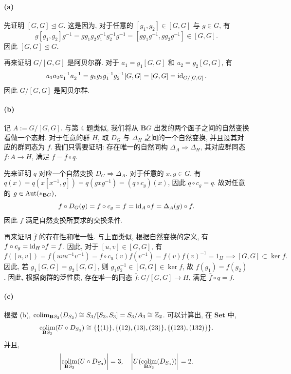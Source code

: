\documentclass{article}
\begin{document}
\begin{solution}
	\paragraph{(a)} 先证明 $[G,G] \unlhd G$. 这是因为, 对于任意的 $[g_1, g_2] \in [G, G]$ 与 $g \in G$, 有
	\[ g[g_1, g_2]g^{-1} = gg_1g_2g_1^{-1}g_2^{-1}g^{-1} = [gg_1g^{-1}, gg_2g^{-1}] \in [G, G]. \]
	因此 $[G, G] \unlhd G$. 

	再来证明 $G/[G, G]$ 是阿贝尔群. 对于 $a_1 = g_1[G, G]$ 和 $a_2 = g_2[G, G]$, 有
	\[ a_1a_2a_1^{-1}a_2^{-1} = g_1g_2g_1^{-1}g_2^{-1}[G, G] = [G, G] = \operatorname{id}_{G/[G, G]}. \]
	因此 $G/[G, G]$ 是阿贝尔群.

	\paragraph{(b)} 记 $A := G/[G, G]$. 与第 4 题类似, 我们将从 $\mathbf{B}G$ 出发的两个函子之间的自然变换看做一个态射. 对于任意的群 $H$, 取 $D_G$ 与 $\Delta_H$ 之间的一个自然变换, 并且设其对应的群同态为 $f$. 我们只需要证明: 存在唯一的自然同构 $\Delta_A \Rightarrow \Delta_H$, 其对应群同态 $\bar{f}: A \to H$, 满足 $f = \bar{f} \circ q$. 

	先来证明 $q$ 对应一个自然变换 $D_G \Rightarrow \Delta_A$. 对于任意的 $x, g \in G$, 有 $q(x) = q(x[x^{-1}, g]) = q(gxg^{-1}) = (q \circ c_g)(x)$, 因此 $q \circ c_g = q$. 故对任意的 $g \in \operatorname{Aut}(*_{\mathbf{B}G})$, 
	\[ f \circ D_G(g) = f \circ c_g = f = \operatorname{id}_A \circ f = \Delta_A(g) \circ f. \]
	因此 $f$ 满足自然变换所要求的交换条件. 

	再来证明 $\bar{f}$ 的存在性和唯一性. 与上面类似, 根据自然变换的定义, 有 $f \circ c_g = \operatorname{id}_H \circ f = f$. 因此, 对于 $[u, v] \in [G, G]$, 有
	\[ f([u, v]) = f(uvu^{-1}v^{-1}) = f \circ c_u(v) f(v^{-1}) = f(v) f(v)^{-1} = 1_H \implies [G, G] \subset \ker f. \]
	因此, 若 $g_1[G, G] = g_2[G, G]$, 则 $g_1g_2^{-1} \in [G, G] \in \ker f$, 故 $f(g_1) = f(g_2)$. 因此, 根据商群的泛性质, 存在唯一的同态 $\bar{f}: G/[G, G] \to H$, 满足 $\bar{f} \circ q = f$.

	\paragraph{(c)} 根据 (b), $\operatorname*{colim}_{\mathbf{B}S_3}(D_{S_3}) \cong S_3/[S_3, S_3] = S_3/A_3 \cong \mathbb{Z}_2$. 可以计算出, 在 $\mathbf{Set}$ 中, 
	\[ \operatorname*{colim}_{\mathbf{B}S_3}(U \circ D_{S_3}) \cong \{\{(1)\}, \{(12), (13), (23)\}, \{(123), (132)\}\}. \]
	并且, 
	\[ \left|\operatorname*{colim}_{\mathbf{B}S_3}(U \circ D_{S_3})\right| = 3, \quad \left|U(\operatorname*{colim}_{\mathbf{B}S_3}(D_{S_3}))\right| = 2. \]
\end{solution}
\end{document}
